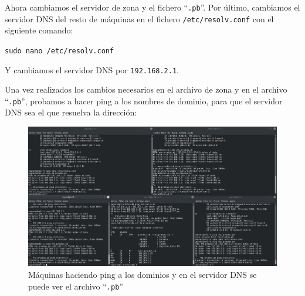 \documentclass[12pt,letterpaper]{article}
\begin{document}
Ahora cambiamos el servidor de zona y el fichero ``\texttt{.pb}''. Por último, cambiamos el servidor DNS del resto de máquinas en el fichero \texttt{/etc/resolv.conf} con el siguiente comando:
\begin{center}
	\texttt{sudo nano /etc/resolv.conf}
\end{center}

Y cambiamos el servidor DNS por \texttt{192.168.2.1}.

Una vez realizados los cambios necesarios en el archivo de zona y en el archivo ``\texttt{.pb}'', probamos a hacer ping a los nombres de dominio, para que el servidor DNS sea el que resuelva la dirección:
\begin{figure}[h]
	\centering
	\includegraphics[scale=0.25]{DNS.png}
	\caption{Máquinas haciendo ping a los dominios y en el servidor DNS se puede ver el archivo ``\texttt{.pb}''}
\end{figure}
\end{document}
